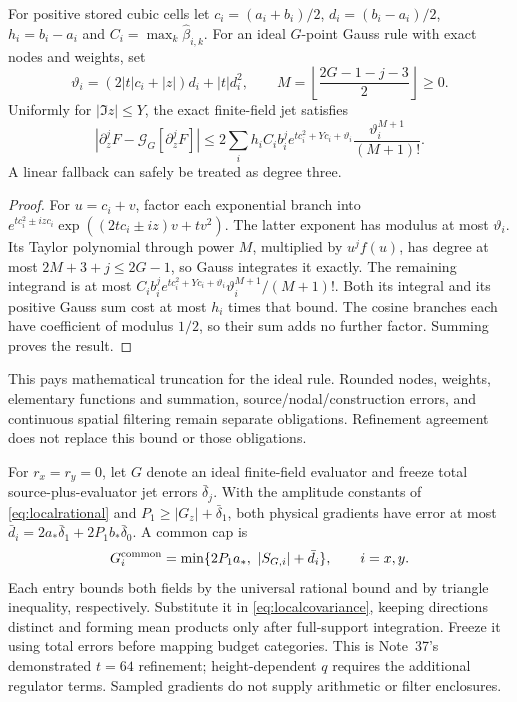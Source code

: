 \begin{proposition}\label{prop:hermite-gauss}
For positive stored cubic cells let $c_i=(a_i+b_i)/2$,
$d_i=(b_i-a_i)/2$, $h_i=b_i-a_i$ and
$C_i=\max_k\widehat\beta_{i,k}$. For an ideal $G$-point Gauss rule
with exact nodes and weights, set
\begin{equation}
 \vartheta_i=(2|t|c_i+|z|)d_i+|t|d_i^2,\qquad
 M=\left\lfloor\frac{2G-1-j-3}{2}\right\rfloor\ge0.
\end{equation}
Uniformly for $|\Im z|\le Y$, the exact finite-field jet satisfies
\begin{equation}
 |\partial_z^jF-\mathcal G_G[\partial_z^jF]|
 \le2\sum_i h_iC_i b_i^j e^{tc_i^2+Yc_i+\vartheta_i}
                    \frac{\vartheta_i^{M+1}}{(M+1)!}.
 \label{eq:hermite-gauss}
\end{equation}
A linear fallback can safely be treated as degree three.
\end{proposition}
\begin{proof}
For $u=c_i+v$, factor each exponential branch into
$e^{tc_i^2\pm izc_i}\exp((2tc_i\pm iz)v+tv^2)$.
The latter exponent has modulus at most $\vartheta_i$.
Its Taylor polynomial through power $M$, multiplied by $u^jf(u)$,
has degree at most $2M+3+j\le2G-1$, so Gauss integrates it exactly.
The remaining integrand is at most
$C_ib_i^je^{tc_i^2+Yc_i+\vartheta_i}
\vartheta_i^{M+1}/(M+1)!$.
Both its integral and its positive Gauss sum cost at most $h_i$ times
that bound. The cosine branches each have coefficient of modulus $1/2$,
so their sum adds no further factor. Summing proves the result.
\end{proof}
This pays mathematical truncation for the ideal rule. Rounded nodes,
weights, elementary functions and summation, source/nodal/construction
errors, and continuous spatial filtering remain separate obligations.
Refinement agreement does not replace this bound or those obligations.

\begin{remark}
For $r_x=r_y=0$, let $G$ denote an ideal finite-field evaluator and
freeze total source-plus-evaluator jet errors $\bar\delta_j$. With the
amplitude constants of \eqref{eq:localrational} and
$P_1\ge|G_z|+\bar\delta_1$, both physical gradients have error at most
$\bar d_i=2a_*\bar\delta_1+2P_1b_*\bar\delta_0$. A common cap is
\[
 G_i^{\rm common}=\min\{2P_1a_*,\ |S_{G,i}|+\bar d_i\},\qquad i=x,y.
\]
Each entry bounds both fields by the universal rational bound and by
triangle inequality, respectively. Substitute it in
\eqref{eq:localcovariance}, keeping directions distinct and forming mean
products only after full-support integration. Freeze it using total errors
before mapping budget categories. This is Note~37's demonstrated
$t=64$ refinement; height-dependent $q$ requires the additional regulator
terms. Sampled gradients do not supply arithmetic or filter enclosures.
\end{remark}
